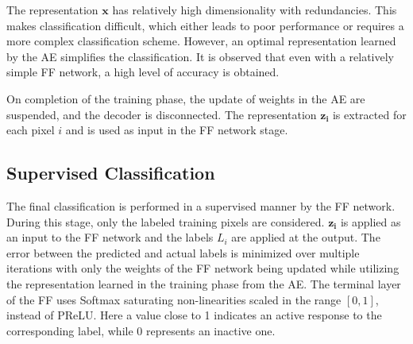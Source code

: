 The representation $\bm{x}$ has relatively high dimensionality with redundancies.
This makes classification difficult, which either leads to poor performance or requires a more complex classification scheme. However, an optimal representation learned by the AE simplifies the classification. It is observed that even with a relatively simple FF network, a high level of accuracy is obtained.  
 
On completion of the training phase, the update of weights in the AE are suspended, and the decoder is disconnected. 
The representation $\bm{z_i}$ is extracted for each pixel $i$ and is used as input in the FF network stage. 

\subsection{Supervised Classification}
The final classification is performed in a supervised manner by the FF network. During this stage, only the labeled training pixels are considered. $\bm{z_i}$ is applied as an input to the FF network and the labels $L_i$ are applied at the output. The error between the predicted and actual labels is minimized over multiple iterations with only the weights of the FF network being updated while utilizing the representation learned in the training phase from the AE. The terminal layer of the FF uses Softmax saturating non-linearities scaled in the range $[0,1]$, instead of PReLU. Here a value close to 1 indicates an active response to the corresponding label, while 0 represents an inactive one.  


